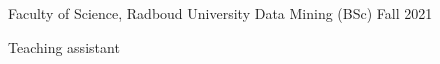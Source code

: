 \begin{cventries}
  \cventry
    {Faculty of Science, Radboud University} %
    {Data Mining (BSc)} %
    {}
    {Fall 2021} %
    {
      \begin{cvitems} %
        \item {Teaching assistant}
      \end{cvitems}
    }

\end{cventries}
